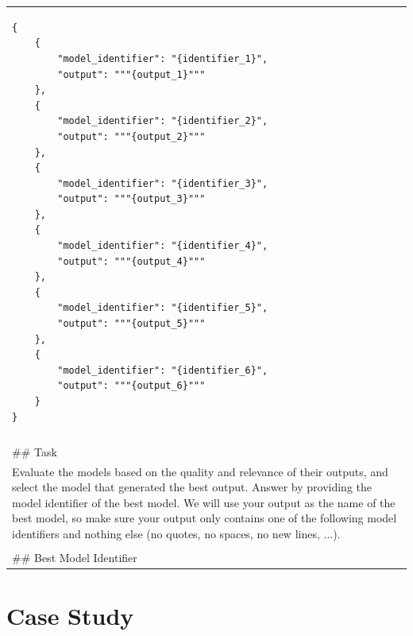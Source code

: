 \documentclass{article}
\begin{document}
\begin{table}[t]
\begin{tabular}{@{}p{1\linewidth}@{}}
\begin{verbatim}
{
    {
        "model_identifier": "{identifier_1}",
        "output": """{output_1}"""
    },
    {
        "model_identifier": "{identifier_2}",
        "output": """{output_2}"""
    },
    {
        "model_identifier": "{identifier_3}",
        "output": """{output_3}"""
    },
    {
        "model_identifier": "{identifier_4}",
        "output": """{output_4}"""
    },
    {
        "model_identifier": "{identifier_5}",
        "output": """{output_5}"""
    },
    {
        "model_identifier": "{identifier_6}",
        "output": """{output_6}"""
    }
}
\end{verbatim}
\\
\\
\#\# Task
\\
Evaluate the models based on the quality and relevance of their outputs, and select the model that generated the best output. Answer by providing the model identifier of the best model. We will use your output as the name of the best model, so make sure your output only contains one of the following model identifiers and nothing else (no quotes, no spaces, no new lines, ...).
\\
\\
\#\# Best Model Identifier
\\
    \bottomrule
    \end{tabular}
    \label{tab:template_ranking}
\end{table}



\section{Case Study}
\end{document}
